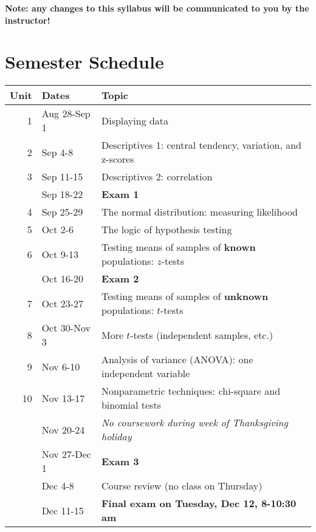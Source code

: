 \documentclass[10pt]{article}
\begin{document}
\textbf{\textbf{Note:  any changes to this syllabus will be communicated to you by the instructor!}}

\section*{Semester Schedule}
\label{sec-11}
\begin{center}
\begin{tabular}{rll}
Unit & Dates & Topic\\
\hline
1 & Aug 28-Sep 1 & Displaying data\\
2 & Sep 4-8 & Descriptives 1: central tendency, variation, and z-scores\\
3 & Sep 11-15 & Descriptives 2: correlation\\
 & Sep 18-22 & \textbf{Exam 1}\\
4 & Sep 25-29 & The normal distribution: measuring likelihood\\
5 & Oct 2-6 & The logic of hypothesis testing\\
6 & Oct 9-13 & Testing means of samples of \textbf{known} populations: $z$-tests\\
 & Oct 16-20 & \textbf{Exam 2}\\
7 & Oct 23-27 & Testing means of samples of \textbf{unknown} populations: $t$-tests\\
8 & Oct 30-Nov 3 & More $t$-tests (independent samples, etc.)\\
9 & Nov 6-10 & Analysis of variance (ANOVA): one independent variable\\
10 & Nov 13-17 & Nonparametric techniques: chi-square and binomial tests\\
 & Nov 20-24 & \emph{No coursework during week of Thanksgiving holiday}\\
 & Nov 27-Dec 1 & \textbf{Exam 3}\\
 & Dec 4-8 & Course review (no class on Thursday)\\
 & Dec 11-15 & \textbf{Final exam on Tuesday, Dec 12, 8-10:30 am}\\
\end{tabular}
\end{center}
\end{document}
